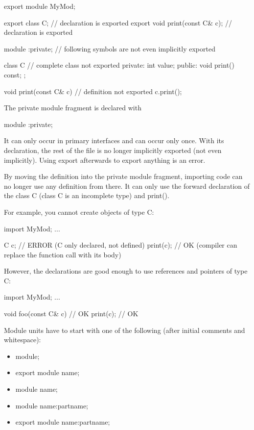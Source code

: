\begin{cpp}
export module MyMod;

export class C; // declaration is exported
export void print(const C& c); // declaration is exported

module :private; // following symbols are not even implicitly exported

class C { // complete class not exported
	private:
	int value;
	public:
	void print() const;
};

void print(const C& c) { // definition not exported
	c.print();
}
\end{cpp}

The private module fragment is declared with

\begin{cpp}
module :private;
\end{cpp}

It can only occur in primary interfaces and can occur only once. With its declaration, the rest of the file is no longer implicitly exported (not even implicitly). Using export afterwards to export anything is an error.

By moving the definition into the private module fragment, importing code can no longer use any definition from there. It can only use the forward declaration of the class C (class C is an incomplete type) and print().

For example, you cannot create objects of type C:

\begin{cpp}
import MyMod;
...

C c; // ERROR (C only declared, not defined)
print(c); // OK (compiler can replace the function call with its body)
\end{cpp}

However, the declarations are good enough to use references and pointers of type C:

\begin{cpp}
import MyMod;
...

void foo(const C& c) { // OK
	print(c); // OK
}
\end{cpp}


Module units have to start with one of the following (after initial comments and whitespace):

\begin{itemize}
\item 
module;

\item 
export module name;

\item 
module name;

\item 
module name:partname;

\item 
export module name:partname;
\end{itemize}

